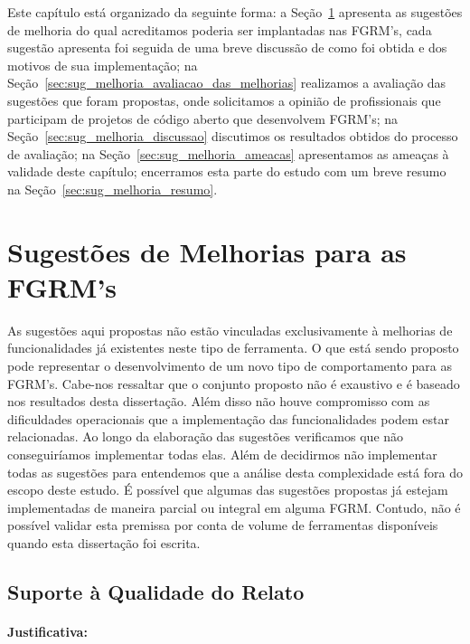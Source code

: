 Este capítulo está organizado da seguinte forma: a
Seção~\ref{sec:sug_melhoria_melhorando_as_ferraementas} apresenta as sugestões
de melhoria do qual acreditamos poderia ser implantadas nas FGRM's, cada
sugestão apresenta foi seguida de uma breve discussão de como foi obtida e dos
motivos de sua implementação; na
Seção~\ref{sec:sug_melhoria_avaliacao_das_melhorias} realizamos a avaliação das
sugestões que foram propostas, onde solicitamos a opinião de profissionais que
participam de projetos de código aberto que desenvolvem FGRM's; na
Seção~\ref{sec:sug_melhoria_discussao} discutimos os resultados obtidos do
processo de avaliação; na Seção~\ref{sec:sug_melhoria_ameacas} apresentamos as
ameaças à validade deste capítulo; encerramos esta parte do estudo com um breve
resumo na Seção~\ref{sec:sug_melhoria_resumo}.

\section{Sugestões de Melhorias para as FGRM's}
\label{sec:sug_melhoria_melhorando_as_ferraementas}

As sugestões aqui propostas não estão vinculadas exclusivamente à melhorias de
funcionalidades já existentes neste tipo de ferramenta. O que está sendo
proposto pode representar o desenvolvimento de um novo tipo de comportamento
para as FGRM's. Cabe-nos ressaltar que o conjunto proposto não é exaustivo e é
baseado nos resultados desta dissertação. Além disso não houve compromisso com
as dificuldades operacionais que a implementação das funcionalidades podem estar
relacionadas. Ao longo da elaboração das sugestões verificamos que não
conseguiríamos implementar todas elas. Além de decidirmos não implementar todas
as sugestões para entendemos que a análise desta complexidade está fora do
escopo deste estudo. É possível que algumas das su\-ges\-tões propostas já
estejam implementadas de maneira parcial ou integral em alguma FGRM\@.  Contudo,
não é possível validar esta premissa por conta de volume de ferramentas
disponíveis quando esta dissertação foi escrita.

\subsection{Suporte à Qualidade do Relato}
\label{sub:supote_à_qualidade_do_relato}


\paragraph{Justificativa:}
\label{par:justificativa_s01}

